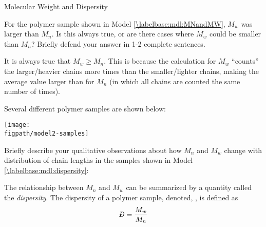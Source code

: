 \begin{activity}{Molecular Weight and Dispersity}
\begin{ctqs}
	\question For the polymer sample shown in Model \ref{\labelbase:mdl:MNandMW}, $M_w$ was larger than $M_n$.  Is this always true, or are there cases where $M_w$ could be smaller than $M_n$?  Briefly defend your answer in 1-2 complete sentences.
	
		\label{\labelbase:ctq:MWvsMN}
		
		\begin{solution}[2in]
		
			It is always true that $M_w \geq M_n$.  This is because the calculation for $M_w$ ``counts'' the larger/heavier chains more times than the smaller/lighter chains, making the average value larger than for $M_n$ (in which all chains are counted the same number of times).
			
		\end{solution}
	
		
\end{ctqs}

\begin{model}
\label{\labelbase:mdl:dispersity}

	Several different polymer samples are shown below:
	
	\vspace{6pt}
	\centerline{\texttt{[image: \\figpath/model2-samples]}}

\end{model}
	
\begin{ctqs}

	\question Briefly describe your qualitative observations about how $M_n$ and $M_w$ change with distribution of chain lengths in the samples shown in Model \ref{\labelbase:mdl:dispersity}:
	
		\begin{solution}[2in]
		\end{solution}
	
\end{ctqs}

\begin{infobox}

	The relationship between $M_n$ and $M_w$ can be summarized by a quantity called the \emph{dispersity}.  The dispersity of a polymer sample, denoted, \PDItext, is defined as
	\begin{equation*}
		\PDImath = \frac{M_w}{M_n}
	\end{equation*}
	

\end{infobox}
\end{activity}
